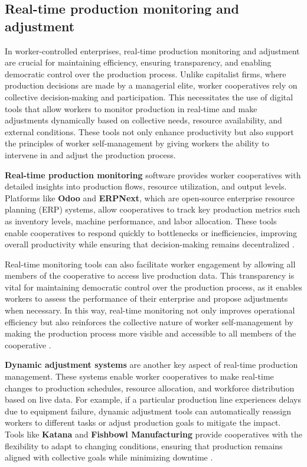 \begin{refsection}
\subsection{Real-time production monitoring and adjustment}

In worker-controlled enterprises, real-time production monitoring and adjustment are crucial for maintaining efficiency, ensuring transparency, and enabling democratic control over the production process. Unlike capitalist firms, where production decisions are made by a managerial elite, worker cooperatives rely on collective decision-making and participation. This necessitates the use of digital tools that allow workers to monitor production in real-time and make adjustments dynamically based on collective needs, resource availability, and external conditions. These tools not only enhance productivity but also support the principles of worker self-management by giving workers the ability to intervene in and adjust the production process.

\textbf{Real-time production monitoring} software provides worker cooperatives with detailed insights into production flows, resource utilization, and output levels. Platforms like \textbf{Odoo} and \textbf{ERPNext}, which are open-source enterprise resource planning (ERP) systems, allow cooperatives to track key production metrics such as inventory levels, machine performance, and labor allocation. These tools enable cooperatives to respond quickly to bottlenecks or inefficiencies, improving overall productivity while ensuring that decision-making remains decentralized \cite[pp.~101-105]{schweickart2011}.

Real-time monitoring tools can also facilitate worker engagement by allowing all members of the cooperative to access live production data. This transparency is vital for maintaining democratic control over the production process, as it enables workers to assess the performance of their enterprise and propose adjustments when necessary. In this way, real-time monitoring not only improves operational efficiency but also reinforces the collective nature of worker self-management by making the production process more visible and accessible to all members of the cooperative \cite[pp.~75-77]{wright2010}.

\textbf{Dynamic adjustment systems} are another key aspect of real-time production management. These systems enable worker cooperatives to make real-time changes to production schedules, resource allocation, and workforce distribution based on live data. For example, if a particular production line experiences delays due to equipment failure, dynamic adjustment tools can automatically reassign workers to different tasks or adjust production goals to mitigate the impact. Tools like \textbf{Katana} and \textbf{Fishbowl Manufacturing} provide cooperatives with the flexibility to adapt to changing conditions, ensuring that production remains aligned with collective goals while minimizing downtime \cite[pp.~98-101]{restakis2012}.


\end{refsection}
